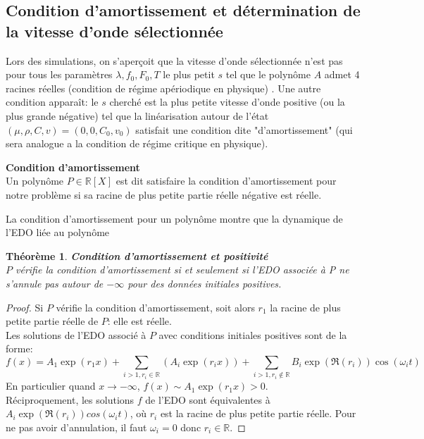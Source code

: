 \documentclass[11pt]{article}
\newtheorem{theorem}{Théorème}
\begin{document}
\subsection{Condition d'amortissement et détermination de la vitesse d'onde sélectionnée}
Lors des simulations, on s’aperçoit que la vitesse d'onde sélectionnée n'est pas pour tous les paramètres $\lambda,f_0,F_0,T$ le plus petit $s$ tel que le polynôme $A$ admet 4 racines réelles (condition de régime apériodique en physique) . Une autre condition apparaît: le $s$ cherché est la plus petite vitesse d'onde positive (ou la plus grande négative) tel que la linéarisation autour de l’état $(\mu,\rho,C,v) = (0,0,C_0,v_0)$ satisfait une condition dite "d'amortissement" (qui sera analogue a la condition de régime critique en physique).
\begin{definition}{\textbf{Condition d'amortissement}} \\ Un polynôme $P \in \mathbb{R}[X]$ est dit satisfaire la condition d'amortissement pour notre problème si sa racine de plus petite partie réelle négative est réelle.
\end{definition}

La condition d'amortissement pour un polynôme montre que la dynamique de l'EDO liée au polynôme
\begin{theorem}\textbf{{Condition d'amortissement et positivité} }\\
$P$ vérifie la condition d'amortissement si et seulement si l'EDO associée à P ne s'annule pas autour de $-\infty$ pour des données initiales positives.
\end{theorem}
\begin{proof}Si $P$ vérifie la condition d'amortissement, soit alors $r_1$ la racine de plus petite partie réelle de $P$: elle est réelle. \\ 
Les solutions de l'EDO associé à $P$ avec conditions initiales positives sont de la forme: \begin{equation}
	f(x)=A_1\exp(r_1x)+ \sum_{i>1,r_i\in\mathbb{R}}(A_i\exp(r_ix)) + \sum_{i>1,r_i\not\in\mathbb{R}}B_i\exp(\Re(r_i))\cos(\omega_it)
\end{equation}
En particulier quand $x\to -\infty$, $f(x)\sim  A_1\exp(r_1x) >0$.\\
Réciproquement, les solutions $f$ de l'EDO sont équivalentes à $A_i\exp(\Re(r_i))cos(\omega_it)$, où $r_i$ est la racine de plus petite partie réelle. Pour ne pas avoir d’annulation, il faut $\omega_i =0 $ donc $r_i \in \mathbb{R}.$
\end{proof}
\end{document}
